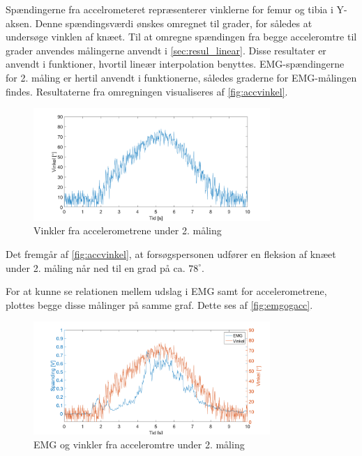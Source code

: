 Spændingerne fra accelrometeret repræsenterer vinklerne for femur og tibia i Y-aksen. Denne spændingsværdi ønskes omregnet til grader, for således at undersøge vinklen af knæet. Til at omregne spændingen fra begge acceleromtre til grader anvendes målingerne anvendt i \autoref{sec:resul_linear}. Disse resultater er anvendt i funktioner, hvortil lineær interpolation benyttes. EMG-spændingerne for 2. måling er hertil anvendt i funktionerne, således graderne for EMG-målingen findes.
Resultaterne fra omregningen visualiseres af \autoref{fig:accvinkel}. 

\begin{figure}[H]
	\centering
	\includegraphics[width=0.8\textwidth]{figures/Pilotforsoeg/accvinkel}
	\caption{Vinkler fra accelerometrene under 2. måling}
	\label{fig:accvinkel}
\end{figure}
Det fremgår af \autoref{fig:accvinkel}, at forsøgspersonen udfører en fleksion af knæet under 2. måling når ned til en grad på ca. $78^{\circ}$. 

For at kunne se relationen mellem udslag i EMG samt for accelerometrene, plottes begge disse målinger på samme graf. Dette ses af \autoref{fig:emgogacc}. 
\begin{figure}[H]
	\centering
	\includegraphics[width=0.8\textwidth]{figures/Pilotforsoeg/emg_vinkler_tid}
	\caption{EMG og vinkler fra acceleromtre under 2. måling}
	\label{fig:emgogacc}
\end{figure}




